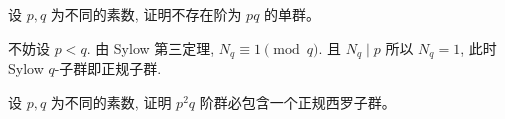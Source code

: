 

    

\begin{problem}
    设 $p,q $ 为不同的素数, 证明不存在阶为 $pq $ 的单群。
\end{problem}

\begin{solution}
    不妨设 $ p<q$. 由 Sylow 第三定理, $N_{q}\equiv1\pmod{q}$. 且 $N_{q}\mid p$
    所以 $N_{q}=1$, 此时 Sylow $q$-子群即正规子群.
\end{solution}

\begin{problem}
    设 $p,q $ 为不同的素数, 证明 $p^2 q $ 阶群必包含一个正规西罗子群。
\end{problem}

